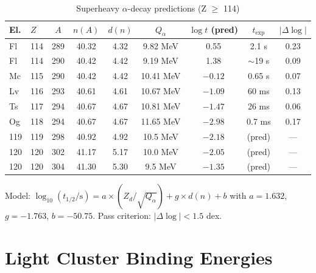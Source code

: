 \begin{table}[htbp]
\centering
\caption{Superheavy $\alpha$-decay predictions (Z $\geq$ 114)}
\label{tab:superheavy_predictions}
\small
\begin{tabular}{llccccccc}
    \toprule
    El. & $Z$ & $A$ & $n(A)$ & $d(n)$ & $Q_\alpha$ & $\log t$ (pred) & $t_{\text{exp}}$ & $|\Delta\log|$ \\
    \midrule
    Fl & 114 & 289 & 40.32 & 4.32 & 9.82 MeV & 0.55 & 2.1 s & 0.23 \\
    Fl & 114 & 290 & 40.42 & 4.42 & 9.19 MeV & 1.38 & $\sim$19 s & 0.09 \\
    Mc & 115 & 290 & 40.42 & 4.42 & 10.41 MeV & $-0.12$ & 0.65 s & 0.07 \\
    Lv & 116 & 293 & 40.61 & 4.61 & 10.67 MeV & $-1.09$ & 60 ms & 0.13 \\
    Ts & 117 & 294 & 40.67 & 4.67 & 10.81 MeV & $-1.47$ & 26 ms & 0.06 \\
    Og & 118 & 294 & 40.67 & 4.67 & 11.65 MeV & $-2.98$ & 0.7 ms & 0.17 \\
    \midrule
    119 & 119 & 298 & 40.92 & 4.92 & 10.5 MeV & $-2.18$ & (pred) & --- \\
    120 & 120 & 302 & 41.17 & 5.17 & 10.0 MeV & $-2.05$ & (pred) & --- \\
    120 & 120 & 304 & 41.30 & 5.30 & 9.5 MeV & $-1.35$ & (pred) & --- \\
    \bottomrule
\end{tabular}

\vspace{2mm}
\footnotesize
Model: $\log_{10}(t_{1/2}/\text{s}) = a \times (Z_d/\sqrt{Q_\alpha}) + g \times d(n) + b$
with $a = 1.632$, $g = -1.763$, $b = -50.75$.
Pass criterion: $|\Delta\log| < 1.5$ dex.
\end{table}

\section{Light Cluster Binding Energies}
\label{sec:tables:light}

